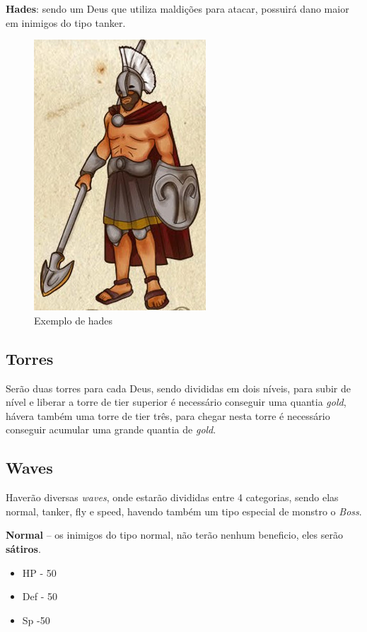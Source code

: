 \documentclass[11pt]{article} %
\begin{document}
{\large \textbf{Hades}}: sendo um Deus que utiliza maldições para atacar, possuirá dano maior em inimigos do tipo tanker.
\begin{figure}[!htp]
\centering
\includegraphics[scale=0.25]{res/characters/hades.png}
\caption{Exemplo de hades}
\label{satiro}
\end{figure}

\subsection{Torres}
Serão duas torres para cada Deus, sendo divididas em dois níveis, para subir de nível e liberar a torre de tier superior é necessário conseguir uma quantia \textit{gold}, hávera também uma torre de tier três, para chegar nesta torre é necessário conseguir acumular uma grande quantia de \textit{gold}. 

\subsection{Waves} 

Haverão diversas \textit{waves}, onde estarão divididas entre 4 categorias, sendo elas normal, tanker, fly e  speed, havendo também um tipo especial de monstro o \textit{Boss}.

\textbf{{ {\large Normal}}} – os inimigos do tipo normal, não terão nenhum beneficio, eles serão \textbf{sátiros}.
\begin{itemize}
\item HP - 50
\item Def - 50
\item Sp -50
\end{itemize}
\end{document}
